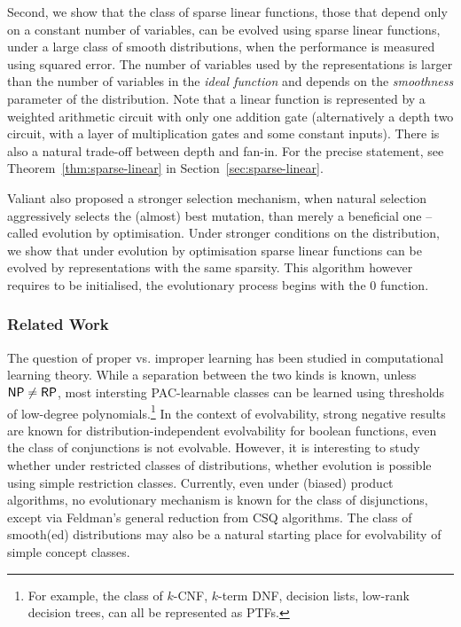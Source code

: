 Second, we show that the class of sparse linear functions, those that depend
only on a constant number of variables, can be evolved using sparse linear
functions, under a large class of smooth distributions, when the performance is
measured using squared error. The number of variables used by the
representations is larger than the number of variables in the \emph{ideal
function} and depends on the \emph{smoothness} parameter of the distribution.
Note that a linear function is represented by a weighted arithmetic circuit with
only one addition gate (alternatively a depth two circuit, with a layer of
multiplication gates and some constant inputs). There is also a natural
trade-off between depth and fan-in. For the precise statement, see
Theorem~\ref{thm:sparse-linear} in Section~\ref{sec:sparse-linear}.

Valiant also proposed a stronger selection mechanism, when natural selection
aggressively selects the (almost) best mutation, than merely a beneficial one --
called evolution by optimisation.  Under stronger conditions on the
distribution, we show that under evolution by optimisation sparse linear
functions can be evolved by representations with the same sparsity. This
algorithm however requires to be initialised, \ie the evolutionary process
begins with the $0$ function.

\subsubsection*{Related Work}

The question of proper vs. improper learning has been studied in computational
learning theory. While a separation between the two kinds is known, unless $\mathsf{NP}
\neq \mathsf{RP}$, most intersting PAC-learnable classes can be learned using thresholds
of low-degree polynomials.\footnote{For example, the class of $k$-CNF, $k$-term
DNF, decision lists, low-rank decision trees, can all be represented as PTFs.}
In the context of evolvability, strong negative results are known for
distribution-independent evolvability for boolean functions, \eg even the class
of conjunctions is not evolvable. However, it is interesting to study whether
under restricted classes of distributions, whether evolution is possible using
simple restriction classes. Currently, even under (biased) product algorithms,
no evolutionary mechanism is known for the class of disjunctions, except via
Feldman's general reduction from CSQ algorithms. The class of smooth(ed)
distributions may also be a natural starting place for evolvability of simple
concept classes.

